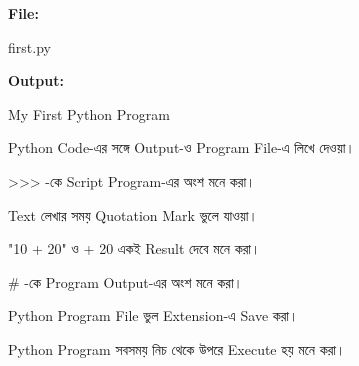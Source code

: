 \textbf{File:}

\begin{codebox}

\begin{english}
\ttfamily
first.py
\end{english}

\end{codebox}

\textbf{Output:}

\begin{codebox}

\begin{english}
\ttfamily
My First Python Program
\end{english}

\end{codebox}



\begin{compacttwocolpoints}

\item Python Code-এর সঙ্গে Output-ও Program File-এ লিখে দেওয়া।

\item
\textenglish{\ttfamily >>>}
-কে Script Program-এর অংশ মনে করা।

\item Text লেখার সময় Quotation Mark ভুলে যাওয়া।

\item
\textenglish{\ttfamily "10 + 20"}
ও
\textenglish{ + 20}
একই Result দেবে মনে করা।

\item
\textenglish{\ttfamily \#}
-কে Program Output-এর অংশ মনে করা।

\item Python Program File ভুল Extension-এ Save করা।

\item Python Program সবসময় নিচ থেকে উপরে Execute হয় মনে করা।

\end{compacttwocolpoints}


